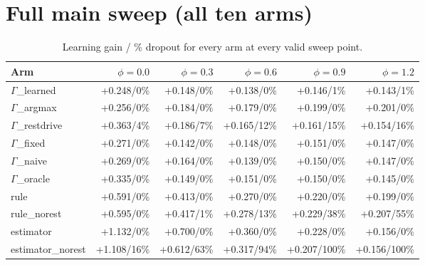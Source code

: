 \documentclass{article}
\begin{document}
\section{Full main sweep (all ten arms)}
\label{app:fullsweep}
\begin{table}[H]
  \caption{Learning gain / \% dropout for every arm at every valid sweep point.}
  \centering\small
  \begin{tabular}{lrrrrr}
    \toprule
    Arm & $\phi{=}0.0$ & $\phi{=}0.3$ & $\phi{=}0.6$ & $\phi{=}0.9$ & $\phi{=}1.2$ \\
    \midrule
    $\Gamma$\_learned & +0.248/0\% & +0.148/0\% & +0.138/0\% & +0.146/1\% & +0.143/1\% \\
    $\Gamma$\_argmax & +0.256/0\% & +0.184/0\% & +0.179/0\% & +0.199/0\% & +0.201/0\% \\
    $\Gamma$\_restdrive & +0.363/4\% & +0.186/7\% & +0.165/12\% & +0.161/15\% & +0.154/16\% \\
    $\Gamma$\_fixed & +0.271/0\% & +0.142/0\% & +0.148/0\% & +0.151/0\% & +0.147/0\% \\
    $\Gamma$\_naive & +0.269/0\% & +0.164/0\% & +0.139/0\% & +0.150/0\% & +0.147/0\% \\
    $\Gamma$\_oracle & +0.335/0\% & +0.149/0\% & +0.151/0\% & +0.150/0\% & +0.145/0\% \\
    rule & +0.591/0\% & +0.413/0\% & +0.270/0\% & +0.220/0\% & +0.199/0\% \\
    rule\_norest & +0.595/0\% & +0.417/1\% & +0.278/13\% & +0.229/38\% & +0.207/55\% \\
    estimator & +1.132/0\% & +0.700/0\% & +0.360/0\% & +0.228/0\% & +0.156/0\% \\
    estimator\_norest & +1.108/16\% & +0.612/63\% & +0.317/94\% & +0.207/100\% & +0.156/100\% \\
    \bottomrule
  \end{tabular}
\end{table}
\end{document}
